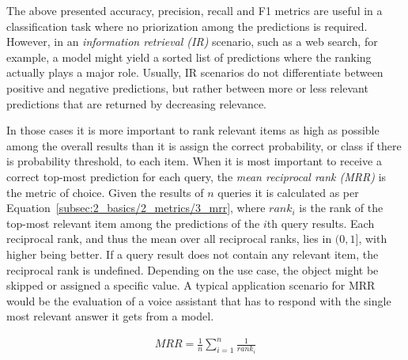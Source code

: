 The above presented accuracy, precision, recall and F1 metrics are useful in a classification task where no priorization among the predictions is required. However, in an \emph{information retrieval (IR)} scenario, such as a web search, for example, a model might yield a sorted list of predictions where the ranking actually plays a major role. Usually, IR scenarios do not differentiate between positive and negative predictions, but rather between more or less relevant predictions that are returned by decreasing relevance.

In those cases it is more important to rank relevant items as high as possible among the overall results than it is assign the correct probability, or class if there is probability threshold, to each item. When it is most important to receive a correct top-most prediction for each query, the \emph{mean reciprocal rank (MRR)} is the metric of choice. Given the results of $n$ queries it is calculated as per Equation~\ref{subsec:2_basics/2_metrics/3_mrr}, where $rank_i$ is the rank of the top-most relevant item among the predictions of the $i$th query results. Each reciprocal rank, and thus the mean over all reciprocal ranks, lies in $(0, 1]$, with higher being better. If a query result does not contain any relevant item, the reciprocal rank is undefined. Depending on the use case, the object might be skipped or assigned a specific value. A typical application scenario for MRR would be the evaluation of a voice assistant that has to respond with the single most relevant answer it gets from a model.

\begin{align}
    MRR = \frac{1}{n} \sum_{i=1}^{n} \frac{1}{rank_i}
    \label{eq:2_basics/2_metrics/3_mrr/mrr}
\end{align}
